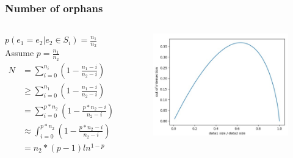 \documentclass[notheorems, aspectratio=54]{beamer}
\begin{document}
\begin{frame}
    \frametitle{Number of orphans}
    \begin{columns}
        \begin{column}{0.48\textwidth}
            $p(e_1=e_2|e_2\in S_i) = \frac{n_1}{n_2}$ \\
            Assume $p = \frac{n_1}{n_2}$
            \begin{equation}
                \begin{aligned}
                    N &= \sum_{i=0}^{n_i}{(1-\frac{n_1-i}{n_2-i})} \\
                      &\geq \sum_{i=0}^{n_1}{(1-\frac{n_1-i}{n_2-i})} \\
                      &= \sum_{i=0}^{p*n_2}{(1-\frac{p*n_2-i}{n_2-i})}\\
                      &\approx \int_{i=0}^{p*n_2}{(1-\frac{p*n_2-i}{n_2-i})}\\
                      &= n_2*(p-1)ln^{1-p}
                \end{aligned}
            \end{equation}
        \end{column}
        \begin{column}{0.48\textwidth}
            \begin{figure}
                \centering
                \includegraphics[width=6cm]{global_img_dir/op1.png}
                \caption{}
            \end{figure}
        \end{column}
    \end{columns}
\end{frame}
\end{document}
